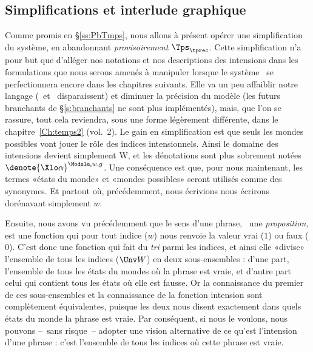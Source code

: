 \newpage

\subsection{Simplifications et interlude graphique}
\label{ss:s&ig}

Comme promis en \S\ref{ss:PbTmps}, nous allons à présent opérer une simplification du système, en abandonnant \emph{provisoirement} {$\Tps_{\tprec}$}.
Cette simplification n'a pour but que d'alléger nos notations et nos descriptions des intensions dans les formulations que nous serons amenés à manipuler lorsque le système \LO\ se perfectionnera encore dans les chapitres suivants.
Elle va un peu affaiblir notre langage {\LO} (\mP\ et \mF\ disparaissent) et diminuer la précision du modèle (les futurs branchants de \S\ref{s:branchants} ne sont plus implémentés), mais, que l'on se rassure, tout cela reviendra, sous une forme légèrement différente, dans le chapitre~\ref{Ch:temps2} (vol.~2).
Le gain en simplification est que seuls les mondes possibles vont jouer le rôle des indices intensionnels. Ainsi le domaine des intensions devient simplement \Unv W, et les dénotations sont plus sobrement notées \(\denote{\Xlo\alpha}^{\Modele,w,g}\).  Une conséquence est que, pour nous maintenant, les termes «états du monde»  et «mondes possibles» seront utilisés comme des synonymes. 
Et partout où, précédemment, nous écrivions  %
nous écrirons dorénavant simplement $w$.


Ensuite, nous avons vu précédemment que le sens d'une phrase, \ie\ une \emph{proposition}, est une fonction qui pour tout indice ($w$) nous renvoie la valeur vrai ($1$) ou faux ($0$). %
C'est donc une fonction qui fait du \emph{tri} parmi les indices, et ainsi elle «divise» l'ensemble de tous les indices ($\Unv W$) en deux sous-ensembles : 
d'une part, l'ensemble de tous les états du mondes où la phrase est vraie, et d'autre part celui qui contient tous les états où elle est fausse. 
Or la connaissance du premier de ces sous-ensembles et la connaissance de la fonction intension sont complètement équivalentes, puisque les deux nous disent exactement dans quels états du monde la phrase est vraie.
Par conséquent, si nous le voulons, nous pouvons --~sans risque~-- adopter une vision alternative de ce qu'est l'intension d'une phrase : c'est l'ensemble de tous les indices où cette phrase est vraie.

